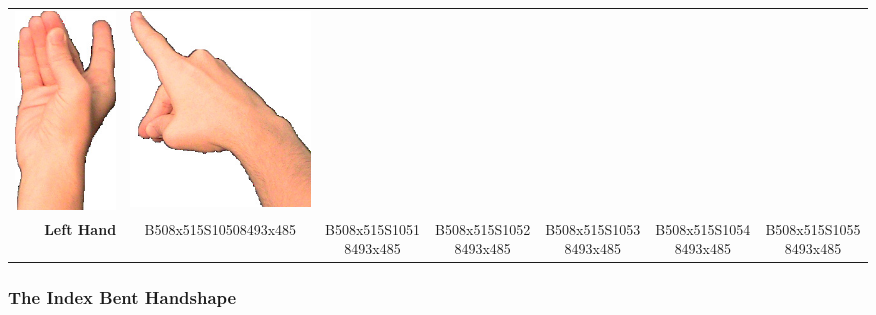 \documentclass{article}
\begin{document}
\begin{center}
\begin{tabular}{r*{6}{c}}
\includegraphics[scale=0.1]{images/01-03-5.jpg}&
\includegraphics[scale=0.1]{images/01-03-6.jpg}\\
\textbf{Left Hand}&
B508x515S10508493x485&
B508x515S10518493x485&
B508x515S10528493x485&
B508x515S10538493x485&
B508x515S10548493x485&
B508x515S10558493x485\\
\end{tabular}
\end{center}

\subsubsection{The Index Bent Handshape}
\end{document}
